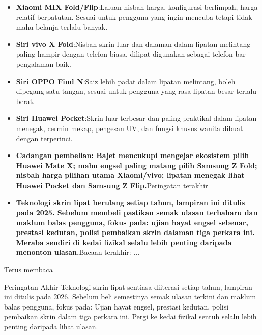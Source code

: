 \begin{itemize}
  \item \textbf{Xiaomi MIX Fold/Flip}:Laluan nisbah harga, konfigurasi berlimpah, harga relatif berpatutan. Sesuai untuk pengguna yang ingin mencuba tetapi tidak mahu belanja terlalu banyak.
  \item \textbf{Siri vivo X Fold}:Nisbah skrin luar dan dalaman dalam lipatan melintang paling hampir dengan telefon biasa, dilipat digunakan sebagai telefon bar pengalaman baik.
  \item \textbf{Siri OPPO Find N}:Saiz lebih padat dalam lipatan melintang, boleh dipegang satu tangan, sesuai untuk pengguna yang rasa lipatan besar terlalu berat.
  \item \textbf{Siri Huawei Pocket}:Skrin luar terbesar dan paling praktikal dalam lipatan menegak, cermin mekap, pengesan UV, dan fungsi khusus wanita dibuat dengan terperinci.
  \item \textbf{Cadangan pembelian: Bajet mencukupi mengejar ekosistem pilih Huawei Mate X; mahu engsel paling matang pilih Samsung Z Fold; nisbah harga pilihan utama Xiaomi/vivo; lipatan menegak lihat Huawei Pocket dan Samsung Z Flip.}Peringatan terakhir
  \item \textbf{Teknologi skrin lipat berulang setiap tahun, lampiran ini ditulis pada 2025. Sebelum membeli pastikan semak ulasan terbaharu dan maklum balas pengguna, fokus pada: ujian hayat engsel sebenar, prestasi kedutan, polisi pembaikan skrin dalaman tiga perkara ini. Meraba sendiri di kedai fizikal selalu lebih penting daripada menonton ulasan.}Bacaan terakhir: ...
\end{itemize}

Terus membaca

\begin{tcbinfo}{Peringatan Akhir}
Teknologi skrin lipat sentiasa diiterasi setiap tahun, lampiran ini ditulis pada 2026. Sebelum beli semestinya semak ulasan terkini dan maklum balas pengguna, fokus pada: Ujian hayat engsel, prestasi kedutan, polisi pembaikan skrin dalam tiga perkara ini. Pergi ke kedai fizikal sentuh selalu lebih penting daripada lihat ulasan.

\end{tcbinfo}
